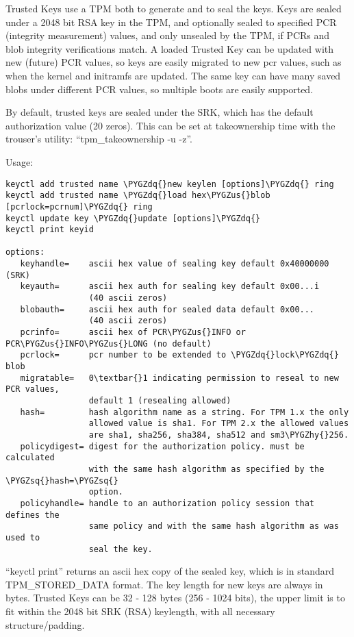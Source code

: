 \documentclass[a4paper,8pt,english]{sphinxmanual}
\def\PYGZus{\char`\_}
\def\PYGZhy{\char`\-}
\def\PYGZsq{\char`\'}
\def\PYGZdq{\char`\"}
\renewcommand\PYGZsq{\textquotesingle}
\begin{document}
Trusted Keys use a TPM both to generate and to seal the keys.  Keys are sealed
under a 2048 bit RSA key in the TPM, and optionally sealed to specified PCR
(integrity measurement) values, and only unsealed by the TPM, if PCRs and blob
integrity verifications match.  A loaded Trusted Key can be updated with new
(future) PCR values, so keys are easily migrated to new pcr values, such as
when the kernel and initramfs are updated.  The same key can have many saved
blobs under different PCR values, so multiple boots are easily supported.

By default, trusted keys are sealed under the SRK, which has the default
authorization value (20 zeros).  This can be set at takeownership time with the
trouser's utility: ``tpm\_takeownership -u -z''.

Usage:

\begin{Verbatim}[commandchars=\\\{\}]
keyctl add trusted name \PYGZdq{}new keylen [options]\PYGZdq{} ring
keyctl add trusted name \PYGZdq{}load hex\PYGZus{}blob [pcrlock=pcrnum]\PYGZdq{} ring
keyctl update key \PYGZdq{}update [options]\PYGZdq{}
keyctl print keyid

options:
   keyhandle=    ascii hex value of sealing key default 0x40000000 (SRK)
   keyauth=      ascii hex auth for sealing key default 0x00...i
                 (40 ascii zeros)
   blobauth=     ascii hex auth for sealed data default 0x00...
                 (40 ascii zeros)
   pcrinfo=      ascii hex of PCR\PYGZus{}INFO or PCR\PYGZus{}INFO\PYGZus{}LONG (no default)
   pcrlock=      pcr number to be extended to \PYGZdq{}lock\PYGZdq{} blob
   migratable=   0\textbar{}1 indicating permission to reseal to new PCR values,
                 default 1 (resealing allowed)
   hash=         hash algorithm name as a string. For TPM 1.x the only
                 allowed value is sha1. For TPM 2.x the allowed values
                 are sha1, sha256, sha384, sha512 and sm3\PYGZhy{}256.
   policydigest= digest for the authorization policy. must be calculated
                 with the same hash algorithm as specified by the \PYGZsq{}hash=\PYGZsq{}
                 option.
   policyhandle= handle to an authorization policy session that defines the
                 same policy and with the same hash algorithm as was used to
                 seal the key.
\end{Verbatim}

``keyctl print'' returns an ascii hex copy of the sealed key, which is in standard
TPM\_STORED\_DATA format.  The key length for new keys are always in bytes.
Trusted Keys can be 32 - 128 bytes (256 - 1024 bits), the upper limit is to fit
within the 2048 bit SRK (RSA) keylength, with all necessary structure/padding.
\end{document}
